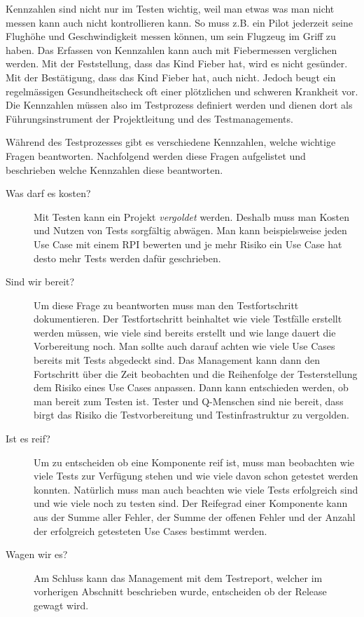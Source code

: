 Kennzahlen sind nicht nur im Testen wichtig, weil man etwas was man nicht messen kann auch nicht kontrollieren kann. So muss z.B. ein Pilot jederzeit seine Flughöhe und Geschwindigkeit messen können, um sein Flugzeug im Griff zu haben. Das Erfassen von Kennzahlen kann auch mit Fiebermessen verglichen werden. Mit der Feststellung, dass das Kind Fieber hat, wird es nicht gesünder. Mit der Bestätigung, dass das Kind Fieber hat, auch nicht. Jedoch beugt ein regelmässigen Gesundheitscheck oft einer plötzlichen und schweren Krankheit vor. Die Kennzahlen müssen also im Testprozess definiert werden und dienen dort als Führungsinstrument der Projektleitung und des Testmanagements.

Während des Testprozesses gibt es verschiedene Kennzahlen, welche wichtige Fragen beantworten. Nachfolgend werden diese Fragen aufgelistet und beschrieben welche Kennzahlen diese beantworten.
\begin{description}
	\item[Was darf es kosten?] Mit Testen kann ein Projekt \textit{vergoldet} werden. Deshalb muss man Kosten und Nutzen von Tests sorgfältig abwägen. Man kann beispielsweise jeden Use Case mit einem RPI bewerten und je mehr Risiko ein Use Case hat desto mehr Tests werden dafür geschrieben.
	\item[Sind wir bereit?] Um diese Frage zu beantworten muss man den Testfortschritt dokumentieren. Der Testfortschritt beinhaltet wie viele Testfälle erstellt werden müssen, wie viele sind bereits erstellt und wie lange dauert die Vorbereitung noch. Man sollte auch darauf achten wie viele Use Cases bereits mit Tests abgedeckt sind. Das Management kann dann den Fortschritt über die Zeit beobachten und die Reihenfolge der Testerstellung dem Risiko eines Use Cases anpassen. Dann kann entschieden werden, ob man bereit zum Testen ist. Tester und Q-Menschen sind nie bereit, dass birgt das Risiko die Testvorbereitung und Testinfrastruktur zu vergolden.
	\item[Ist es reif?] Um zu entscheiden ob eine Komponente reif ist, muss man beobachten wie viele Tests zur Verfügung stehen und wie viele davon schon getestet werden konnten. Natürlich muss man auch beachten wie viele Tests erfolgreich sind und wie viele noch zu testen sind. Der Reifegrad einer Komponente kann aus der Summe aller Fehler, der Summe der offenen Fehler und der Anzahl der erfolgreich getesteten Use Cases bestimmt werden.
	\item[Wagen wir es?] Am Schluss kann das Management mit dem Testreport, welcher im vorherigen Abschnitt beschrieben wurde, entscheiden ob der Release gewagt wird.
\end{description}

